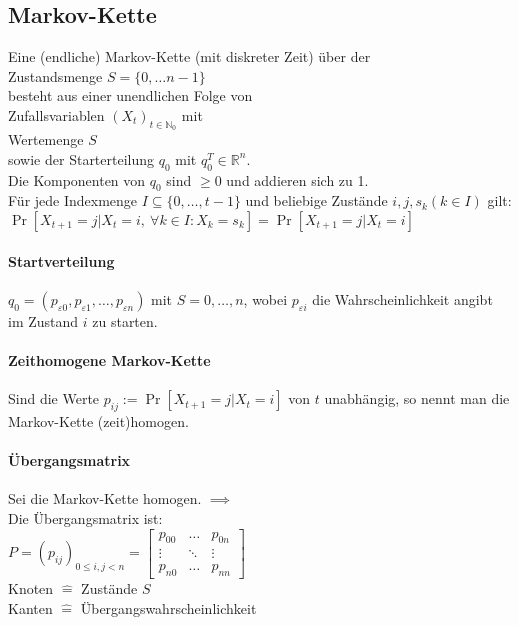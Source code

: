 \documentclass[a4paper,9pt]{extarticle}
\begin{document}
\subsection*{Markov-Kette}
Eine (endliche) Markov-Kette (mit diskreter Zeit) über der \\
Zustandsmenge $S = \{0, \dots n - 1\}$ \\
besteht aus einer unendlichen Folge von \\
Zufallsvariablen $(X_t)_{t \in \mathbb{N}_0}$ mit \\
Wertemenge $S$ \\
sowie der Starterteilung $q_0$ mit $q_0^T \in \mathbb{R}^n$. \\
Die Komponenten von $q_0$ sind $≥ 0$ und addieren sich zu 1. \\
Für jede Indexmenge $I \subseteq \{0, \dots, t - 1\}$ und beliebige Zustände $i, j, s_k (k \in I)$ gilt: \\
$\Pr[X_{t+1} = j | X_t = i,~\forall k \in I : X_k = s_k] = \Pr[X_{t + 1} = j | X_t = i]$

\paragraph*{Startverteilung}
$q_0 = (p_{\varepsilon 0}, p_{\varepsilon 1}, \dots, p_{\varepsilon n})$ mit $S = {0, \dots, n}$, wobei $p_{\varepsilon i}$ die Wahrscheinlichkeit angibt im Zustand $i$ zu starten.

\paragraph*{Zeithomogene Markov-Kette}
Sind die Werte $p_{ij} := \Pr[X_{t+1} = j | X_t = i]$ von $t$ unabhängig, so nennt man die Markov-Kette (zeit)homogen.

\paragraph*{Übergangsmatrix}
Sei die Markov-Kette homogen. $\implies$ \\
Die Übergangsmatrix ist: \\
$P = (p_{ij})_{0 ≤ i,j < n} = \begin{bmatrix}
	p_{00} & \dots & p_{0n} \\
	\vdots & \ddots & \vdots \\
	p_{n0} & \dots & p_{nn}
\end{bmatrix}$ \\

Knoten $\hat{=}$ Zustände $S$ \\
Kanten $\hat{=}$ Übergangswahrscheinlichkeit
\end{document}
